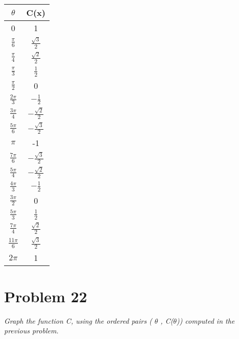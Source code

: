 \documentclass[11pt]{article} %
\begin{document}
\begin{table}
    \begin{tabular}{|c|c|}
    \hline
    $\theta$ & C(x) \\
    \hline
     0   & 1 \\
     \hline
    $\frac{\pi}{6}$		    & $\frac{\sqrt{3}}{2}$  \\
     \hline
    $\frac{\pi}{4}$ 		    & $\frac{\sqrt{2}}{2}$ \\
     \hline
    $\frac{\pi}{3}$    	    & $\frac{1}{2}$\\
      \hline
    $\frac{\pi}{2}$   	    & 0 \\
      \hline
    $\frac{2\pi}{3}$       & $-\frac{1}{2}$ \\
      \hline
    $\frac{3\pi}{4}$   	    & $-\frac{\sqrt{2}}{2}$ \\
      \hline
    $\frac{5\pi}{6}$  	    & $-\frac{\sqrt{3}}{2}$  \\
      \hline
    $\pi$   				 		& -1 \\
      \hline
    $\frac{7\pi}{6}$       & $-\frac{\sqrt{3}}{2}$  \\
      \hline
    $\frac{5\pi}{4}$       & $-\frac{\sqrt{2}}{2}$  \\
      \hline
    $\frac{4\pi}{3}$       & $-\frac{1}{2}$  \\
     \hline
    $\frac{3\pi}{2}$       & 0 \\
     \hline
    $\frac{5\pi}{3}$       & $\frac{1}{2}$ \\
     \hline
    $\frac{7\pi}{4}$       & $\frac{\sqrt{2}}{2}$  \\
     \hline
    $\frac{11\pi}{6}$     & $\frac{\sqrt{3}}{2}$  \\
     \hline
    $2\pi$   				    & 1 \\
    \hline
    \end{tabular}
\end{table}

\section{Problem 22}
\textit{Graph the function C, using the ordered pairs ( $\theta$ , C($\theta$)) computed in the previous problem.}
\\
\end{document}
